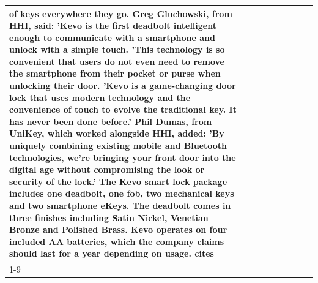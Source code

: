 \begin{table}[H]
\begin{tabular}{lllrlllll}
of keys everywhere they go. Greg Gluchowski, from HHI, said: 'Kevo is the first deadbolt intelligent enough to communicate with a smartphone and unlock with a simple touch. 'This technology is so convenient that users do not even need to remove the smartphone from their pocket or purse when unlocking their door. 'Kevo is a game-changing door lock that uses modern technology and the convenience of touch to evolve the traditional key. It has never been done before.' Phil Dumas, from UniKey, which worked alongside HHI, added: 'By uniquely combining existing mobile and Bluetooth technologies, we’re bringing your front door into the digital age without compromising the look or security of the lock.' The Kevo smart lock package includes one deadbolt, one fob, two mechanical keys and two smartphone eKeys. The deadbolt comes in three finishes including Satin Nickel, Venetian Bronze and Polished Brass. Kevo operates on four included AA batteries, which the company claims should last for a year depending on usage. cites \\
\cline{1-9}

\end{tabular}
\end{table}
